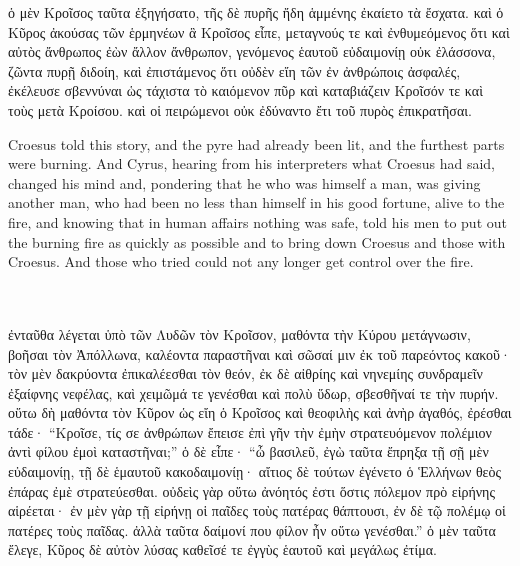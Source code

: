 \documentclass{article}
\begin{document}
\begin{greek}
ὁ μὲν Κροῖσος ταῦτα ἐξηγήσατο, τῆς δὲ πυρῆς ἤδη ἁμμένης ἐκαίετο τὰ ἔσχατα.
καὶ ὁ Κῦρος ἀκούσας τῶν ἑρμηνέων ἃ Κροῖσος εἶπε,
μεταγνούς τε καὶ ἐνθυμεόμενος ὅτι καὶ αὐτὸς ἄνθρωπος ἐὼν ἄλλον ἄνθρωπον,
γενόμενος ἑαυτοῦ εὐδαιμονίῃ οὐκ ἐλάσσονα, ζῶντα πυρῇ διδοίη,
καὶ ἐπιστάμενος ὅτι οὐδὲν εἴη τῶν ἐν ἀνθρώποις ἀσφαλές,
ἐκέλευσε σβεννύναι ὡς τάχιστα τὸ καιόμενον πῦρ
καὶ καταβιάζειν Κροῖσόν τε καὶ τοὺς μετὰ Κροίσου.
καὶ οἱ πειρώμενοι οὐκ ἐδύναντο ἔτι τοῦ πυρὸς ἐπικρατῆσαι. \\
\end{greek}


Croesus told this story, and the pyre had already been lit, and the furthest parts were burning.
And Cyrus, hearing from his interpreters what Croesus had said, changed his mind
and, pondering that he who was himself a man, was giving another man,
who had been no less than himself in his good fortune, alive to the fire,
and knowing that in human affairs nothing was safe, told his men to put out the burning fire as quickly as possible
and to bring down Croesus and those with Croesus.
And those who tried could not any longer get control over the fire. \\ \\ \\


\begin{greek}
ἐνταῦθα λέγεται ὑπὸ τῶν Λυδῶν τὸν Κροῖσον, μαθόντα τὴν Κύρου μετάγνωσιν,
βοῆσαι τὸν Ἀπόλλωνα, καλέοντα παραστῆναι καὶ σῶσαί μιν ἐκ τοῦ παρεόντος κακοῦ·
τὸν μὲν δακρύοντα ἐπικαλέεσθαι τὸν θεόν,
ἐκ δὲ αἰθρίης καὶ νηνεμίης συνδραμεῖν ἐξαίφνης νεφέλας,
καὶ χειμῶμά τε γενέσθαι καὶ πολὺ ὕδωρ, σβεσθῆναί τε τὴν πυρήν.
οὕτω δὴ μαθόντα τὸν Κῦρον ὡς εἴη ὁ Κροῖσος καὶ θεοφιλὴς καὶ ἀνὴρ ἀγαθός, ἐρέσθαι τάδε·
“Κροῖσε, τίς σε ἀνθρώπων ἔπεισε ἐπὶ γῆν τὴν ἐμὴν στρατευόμενον πολέμιον ἀντὶ φίλου ἐμοὶ καταστῆναι;”
ὁ δὲ εἶπε· “ὦ βασιλεῦ, ἐγὼ ταῦτα ἔπρηξα τῇ σῇ μὲν εὐδαιμονίῃ, τῇ δὲ ἑμαυτοῦ κακοδαιμονίῃ·
αἴτιος δὲ τούτων ἐγένετο ὁ Ἑλλήνων θεὸς ἐπάρας ἐμὲ στρατεύεσθαι.
οὐδεὶς γὰρ οὕτω ἀνόητός ἐστι ὅστις πόλεμον πρὸ εἰρήνης αἱρέεται·
ἐν μὲν γὰρ τῇ εἰρήνῃ οἱ παῖδες τοὺς πατέρας θάπτουσι,
ἐν δὲ τῷ πολέμῳ οἱ πατέρες τοὺς παῖδας. ἀλλὰ ταῦτα δαίμονί που φίλον ἦν οὕτω γενέσθαι.”
ὁ μὲν ταῦτα ἔλεγε, Κῦρος δὲ αὐτὸν λύσας καθεῖσέ τε ἐγγὺς ἑαυτοῦ καὶ μεγάλως ἐτίμα. \\
\end{greek}
\end{document}
